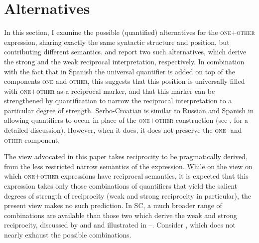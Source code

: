\documentclass[output=paper,colorlinks,citecolor=brown]{langscibook}
\begin{document}
\section{Alternatives}\label{sec:arsenijevic:4}
\begin{sloppypar}
In this section, I examine the possible (quantified) alternatives for the \textsc{one$+$other} expression, sharing exactly the same syntactic structure and position, but contributing different semantics. \citet{v10} and \citet{z14} report two such alternatives, which derive the strong and the weak reciprocal interpretation, respectively. In combination with the fact that in Spanish the universal quantifier is added on top of the components \textsc{one} and \textsc{other}, this suggests that this position is universally filled with \textsc{one$+$other} as a reciprocal marker, and that this marker can be strengthened by quantification to narrow the reciprocal interpretation to a particular degree of strength. Serbo-Croatian is similar to Russian and Spanish in allowing quantifiers to occur in place of the \textsc{one$+$other} construction (see \citeauthor{m14} \citeyear{m14}, \citeyear{m16} for a detailed discussion). However, when it does, it does not preserve the \textsc{one}- and \textsc{other}-component. 
\end{sloppypar}

The view advocated in this paper takes reciprocity to be pragmatically derived, from the less restricted narrow semantics of the expression. While on the view on which \textsc{one$+$other} expressions have reciprocal semantics, it is expected that this expression takes only those combinations of quantifiers that yield the salient degrees of strength of reciprocity (weak and strong reciprocity in particular), the present view makes no such prediction. In SC, a much broader range of combinations are available than those two which derive the weak and strong reciprocity, discussed by \citet{v10} and \citet{z14} and illustrated in --. Consider , which does not nearly exhaust the possible combinations.
\end{document}
